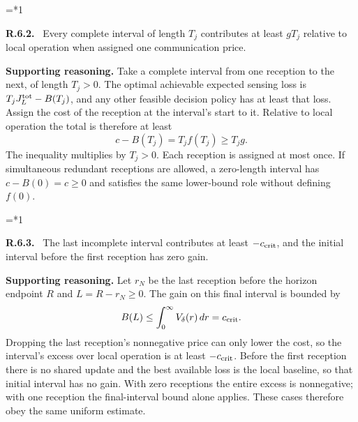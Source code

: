 \documentclass[12pt,letterpaper]{article}
\newenvironment{proofstep}[2]{%
  \begin{list}{}{\leftmargin=\dimexpr 0.17in*#2\relax%
  \setlength{\rightmargin}{0pt}\setlength{\topsep}{5pt}\setlength{\parsep}{2pt}}%
  \item[]\textbf{\textcolor{ink}{#1.}}\ }{\end{list}}
\begin{document}
\begin{proofstep}{R.6.2}{1}
\label{step:R.6.2}
Every complete interval of length $T_j$ contributes at least $gT_j$ relative to local operation when assigned one communication price.

\textbf{Supporting reasoning.}
Take a complete interval from one reception to the next, of length $T_j>0$. The optimal achievable expected sensing loss is $T_jJ_L^{\rm tot}-B(T_j)$, and any other feasible decision policy has at least that loss. Assign the cost of the reception at the interval's start to it. Relative to local operation the total is therefore at least
\[
c-B(T_j)=T_jf(T_j)\ge T_jg.
\]
The inequality multiplies by $T_j>0$. Each reception is assigned at most once. If simultaneous redundant receptions are allowed, a zero-length interval has $c-B(0)=c\ge0$ and satisfies the same lower-bound role without defining $f(0)$.
\par{}
\end{proofstep}

\begin{proofstep}{R.6.3}{1}
\label{step:R.6.3}
The last incomplete interval contributes at least $-c_{\rm crit}$, and the initial interval before the first reception has zero gain.

\textbf{Supporting reasoning.}
Let $r_N$ be the last reception before the horizon endpoint $R$ and $L=R-r_N\ge0$. The gain on this final interval is bounded by
\[
B(L)\le\int_0^\infty V_\delta(r)\,dr=c_{\rm crit}.
\]
Dropping the last reception's nonnegative price can only lower the cost, so the interval's excess over local operation is at least $-c_{\rm crit}$. Before the first reception there is no shared update and the best available loss is the local baseline, so that initial interval has no gain. With zero receptions the entire excess is nonnegative; with one reception the final-interval bound alone applies. These cases therefore obey the same uniform estimate.
\par{}
\end{proofstep}
\end{document}
